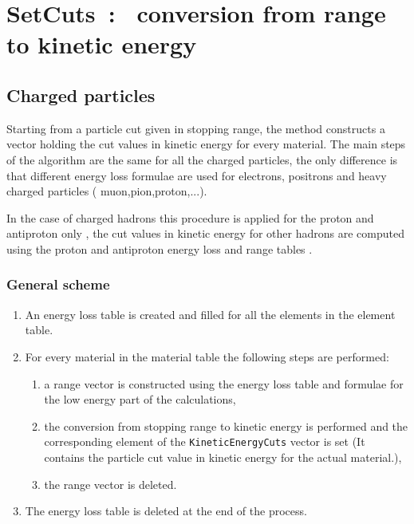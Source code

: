 \chapter[SetCuts\mbox{ : } conversion from range to kinetic energy]
         {SetCuts\mbox{ : } conversion from 
              range to kinetic energy }


\section{Charged particles}
 Starting from a particle cut given in stopping range, the method
 constructs a vector holding the cut values in kinetic energy for every
 material. The main steps of the algorithm are the same for all the
 charged particles, the only difference is that different energy loss
 formulae are used for electrons, positrons and heavy charged particles
 ( muon,pion,proton,...).  

  In the case of charged hadrons this procedure is applied for the proton
 and antiproton only , the cut values in kinetic energy for other hadrons 
 are computed
 using the proton and antiproton energy loss and range tables . 
     \subsection{General scheme}
        \begin{enumerate}
           \item An energy loss table is created and filled for all the elements
                 in the element table.
           \item For every material in the material table the following steps are
                 performed:
              \begin{enumerate}
                 \item a range vector is constructed using the energy loss table and
                       formulae for the low energy part of the calculations,
                 \item the conversion from stopping range to kinetic energy is performed and
                       the corresponding element of the {\tt KineticEnergyCuts} vector is set
                       (It contains the particle cut value in kinetic energy for the
                        actual material.),
                 \item the range vector is deleted.
               \end{enumerate}
          \item The energy loss table is deleted at the end of the process.
       \end{enumerate}
